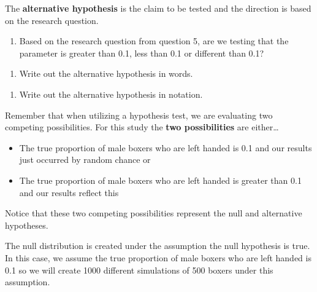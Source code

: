 \documentclass[
]{report}
\providecommand{\tightlist}{%
  \setlength{\itemsep}{0pt}\setlength{\parskip}{0pt}}
\begin{document}
\vspace{0.5in}

The \textbf{alternative hypothesis} is the claim to be tested and the direction is based on the research question.

\begin{enumerate}
\def\labelenumi{\arabic{enumi}.}
\setcounter{enumi}{11}
\tightlist
\item
  Based on the research question from question 5, are we testing that the parameter is greater than 0.1, less than 0.1 or different than 0.1?
\end{enumerate}

\vspace{0.5in}

\begin{enumerate}
\def\labelenumi{\arabic{enumi}.}
\setcounter{enumi}{12}
\tightlist
\item
  Write out the alternative hypothesis in words.
\end{enumerate}

\vspace{1in}

\begin{enumerate}
\def\labelenumi{\arabic{enumi}.}
\setcounter{enumi}{13}
\tightlist
\item
  Write out the alternative hypothesis in notation.
\end{enumerate}

\vspace{0.5in}

Remember that when utilizing a hypothesis test, we are evaluating two competing possibilities. For this study the \textbf{two possibilities} are either\ldots{}

\begin{itemize}
\item
  The true proportion of male boxers who are left handed is 0.1 and our results just occurred by random chance or
\item
  The true proportion of male boxers who are left handed is greater than 0.1 and our results reflect this
\end{itemize}

Notice that these two competing possibilities represent the null and alternative hypotheses.

The null distribution is created under the assumption the null hypothesis is true. In this case, we assume the true proportion of male boxers who are left handed is 0.1 so we will create 1000 different simulations of 500 boxers under this assumption.
\end{document}
